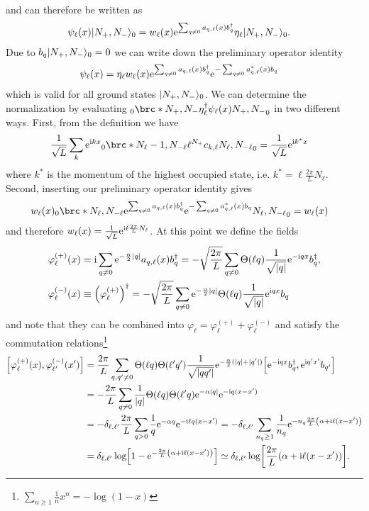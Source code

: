 \documentclass[english, parskip=full]{scrartcl}
\begin{document}
and can therefore be written as
\begin{align}
\psi_\ell(x) \Ket{N_+, N_-}_0 &= w_\ell(x) \powe{\sum_{q\neq 0} a_{q,\ell}(x) b_q^\dagger} \eta_\ell \Ket{N_+, N_-}_0.
\end{align}
Due to $b_q\Ket{N_+,N_-}_0=0$ we can write down the preliminary operator identity
\begin{align}
\psi_\ell(x) &= \eta_\ell w_\ell(x) \powe{\sum_{q\neq 0} a_{q,\ell}(x) b_q^\dagger} \powe{-\sum_{q\neq 0} a_{q,\ell}^\ast(x) b_q}
\end{align}
which is valid for all ground states $\Ket{N_+,N_-}_0$.
We can determine the normalization by evaluating ${}_0\brc*{N_+,N_-}{\eta_\ell^\dagger \psi_\ell(x)}{N_+,N_-}_0$ in two different ways.
First, from the definition we have
\begin{align}
\frac{1}{\sqrt{L}} \sum_k \powe{\i kx} {}_0\brc*{N_\ell-1,N_{-\ell}}{\ell^{N_+} c_{k,\ell}}{N_\ell,N_{-\ell}}_0 &= \frac{1}{\sqrt{L}} \powe{\i k^\ast x}
\end{align}
where $k^\ast$ is the momentum of the highest occupied state, i.e. $k^\ast = \ell \frac{2\pi}{L} N_\ell$.
Second, inserting our preliminary operator identity gives
\begin{align}
w_\ell(x) {}_0\brc*{N_\ell,N_{-\ell}}{\powe{\sum_{q\neq 0} a_{q,\ell}(x) b_q^\dagger} \powe{-\sum_{q\neq 0} a_{q,\ell}^\ast(x) b_q}}{N_\ell, N_{-\ell}}_0 &= w_\ell(x)
\end{align}
and therefore $w_\ell(x) = \frac{1}{\sqrt{L}} \powe{\i\ell \frac{2\pi}{L} N_\ell}$.
At this point we define the fields 
\begin{align}
\varphi_\ell^{(+)}(x) &= \i \sum_{q\neq 0} \powe{-\frac{\alpha}{2}|q|} a_{q,\ell}(x) b_q^\dagger = -\sqrt{\frac{2\pi}{L}}\sum_{q\neq 0} \Theta(\ell q) \frac{1}{\sqrt{|q|}} \powe{-\i qx} b_q^\dagger,\\
\varphi_\ell^{(-)}(x) &\equiv \kla*{\varphi_\ell^{(+)}}^\dagger = -\sqrt{\frac{2\pi}{L}}\sum_{q\neq 0} \powe{-\frac{\alpha}{2}|q|} \Theta(\ell q) \frac{1}{\sqrt{|q|}} \powe{\i qx} b_q
\end{align}
and note that they can be combined into $\varphi_\ell = \varphi_\ell^{(+)} + \varphi_\ell^{(-)}$ and satisfy the commutation relations\footnote{$\sum_{n\ge 1} \frac{1}{n} x^n = -\log(1-x)$}
\begin{align}
\klb*{\varphi_\ell^{(+)}(x), \varphi_{\ell'}^{(-)}(x')} &= \frac{2\pi}{L} \sum_{q,q'\neq 0} \Theta(\ell q) \Theta(\ell' q') \frac{1}{\sqrt{|qq'|}} \powe{-\frac{\alpha}{2}(|q|+|q'|)} \klb*{\powe{-\i qx} b_q^\dagger, \powe{\i q'x'} b_{q'}} \\
&= -\frac{2\pi}{L} \sum_{q\neq 0} \frac{1}{|q|} \Theta(\ell q) \Theta(\ell' q) \powe{-\alpha |q|} \powe{-\i q(x-x')} \\
&= -\delta_{\ell,\ell'} \frac{2\pi}{L} \sum_{q>0} \frac{1}{q} \powe{-\alpha q} \powe{-\i\ell q(x-x')} = -\delta_{\ell,\ell'} \sum_{n_q\ge 1} \frac{1}{n_q} \powe{-n_q \frac{2\pi}{L} \kla*{\alpha + \i\ell (x-x')}} \\
&= \delta_{\ell,\ell'} \log\klb*{1 - \powe{-\frac{2\pi}{L} \kla*{\alpha + \i\ell(x-x')}}} \simeq \delta_{\ell,\ell'} \log\klb*{\frac{2\pi}{L} \kla*{\alpha + \i\ell (x-x')}}.
\end{align}
\end{document}
